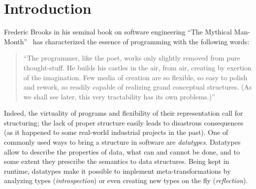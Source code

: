 \section{Introduction}

Frederic Brooks in his seminal book on software engineering ``The Mythical Man-Month''~\cite{MMM} has characterized the essence of programming with the following words:

\blockquote{``The programmer, like the poet, works only slightly removed from pure thought-stuff. He builds his castles in the air, from air, creating by exertion of the imagination. Few media of
creation are so flexible, so easy to polish and rework, so readily capable of realizing grand conceptual structures. (As we shall see later, this very tractability has its own problems.)''}

Indeed, the virtuality of programs and flexibility of their representation call for structuring; the lack of proper structure easily leads to disastrous consequences
(as it happened to some real-world industrial projects in the past). One of commonly used ways to bring a
structure in software are \emph{datatypes}. Datatypes allow to describe the properties of data, what can and cannot be done, and to some extent they prescribe
the semantics to data structures. Being kept in runtime, datatypes make it possible to implement meta-transformations by analyzing types (\emph{introspection})
or even creating new types on the fly (\emph{reflection}).

